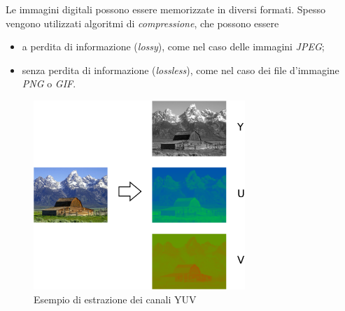 Le immagini digitali possono essere memorizzate in diversi formati.
Spesso vengono utilizzati algoritmi di \textit{compressione}, che possono essere
\begin{itemize}
	\item a perdita di informazione (\textit{lossy}), come nel caso delle immagini \textit{JPEG};
	\item senza perdita di informazione (\textit{lossless}), come nel caso dei file d'immagine \textit{PNG} o \textit{GIF}.
\end{itemize}
	\begin{figure}
		\centering
		\includegraphics[width=8cm]{./pictures/yuv}
		\caption{Esempio di estrazione dei canali YUV}
		\label{fig:yuv}
	\end{figure}

